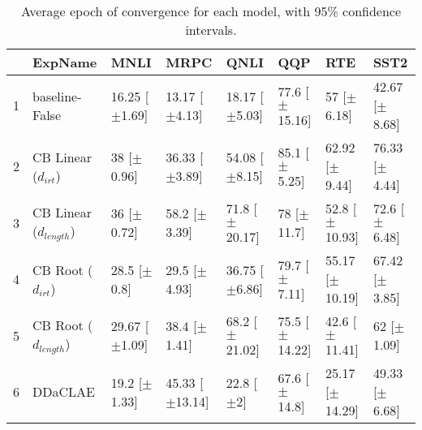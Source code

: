 \begin{table}[ht]
\centering
\begin{tabular}{rlllllll}
  \hline
 & ExpName & MNLI & MRPC & QNLI & QQP & RTE & SST2 \\ 
  \hline
1 & baseline-False & 16.25 [$\pm$1.69] & 13.17 [$\pm$4.13] & 18.17 [$\pm$5.03] & 77.6 [$\pm$15.16] & 57 [$\pm$6.18] & 42.67 [$\pm$8.68] \\ 
  2 & CB Linear ($d_{irt}$) & 38 [$\pm$0.96] & 36.33 [$\pm$3.89] & 54.08 [$\pm$8.15] & 85.1 [$\pm$5.25] & 62.92 [$\pm$9.44] & 76.33 [$\pm$4.44] \\ 
  3 & CB Linear ($d_{length}$) & 36 [$\pm$0.72] & 58.2 [$\pm$3.39] & 71.8 [$\pm$20.17] & 78 [$\pm$11.7] & 52.8 [$\pm$10.93] & 72.6 [$\pm$6.48] \\ 
  4 & CB Root ($d_{irt}$) & 28.5 [$\pm$0.8] & 29.5 [$\pm$4.93] & 36.75 [$\pm$6.86] & 79.7 [$\pm$7.11] & 55.17 [$\pm$10.19] & 67.42 [$\pm$3.85] \\ 
  5 & CB Root ($d_{length}$) & 29.67 [$\pm$1.09] & 38.4 [$\pm$1.41] & 68.2 [$\pm$21.02] & 75.5 [$\pm$14.22] & 42.6 [$\pm$11.41] & 62 [$\pm$1.09] \\ 
  6 & DDaCLAE & 19.2 [$\pm$1.33] & 45.33 [$\pm$13.14] & 22.8 [$\pm$2] & 67.6 [$\pm$14.8] & 25.17 [$\pm$14.29] & 49.33 [$\pm$6.68] \\ 
   \hline
\end{tabular}
\caption{Average epoch of convergence for each model, with 95\% confidence intervals.} 
\end{table}
